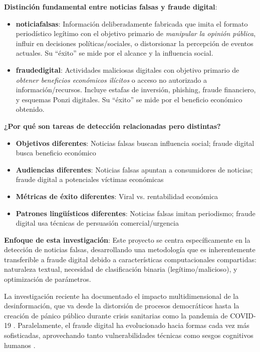 \textbf{Distinción fundamental entre noticias falsas y fraude digital}: 

\begin{itemize}
    \item \textbf{\Glspl{noticiafalsa}}: Información deliberadamente fabricada que imita el formato periodístico legítimo con el objetivo primario de \textit{manipular la opinión pública}, influir en decisiones políticas/sociales, o distorsionar la percepción de eventos actuales. Su ``éxito'' se mide por el alcance y la influencia social.
    
    \item \textbf{\Gls{fraudedigital}}: Actividades maliciosas digitales con objetivo primario de \textit{obtener beneficios económicos ilícitos} o acceso no autorizado a información/recursos. Incluye estafas de inversión, phishing, fraude financiero, y esquemas Ponzi digitales. Su ``éxito'' se mide por el beneficio económico obtenido.
\end{itemize}

\textbf{¿Por qué son tareas de detección relacionadas pero distintas?}
\begin{itemize}
    \item \textbf{Objetivos diferentes}: Noticias falsas buscan influencia social; fraude digital busca beneficio económico
    \item \textbf{Audiencias diferentes}: Noticias falsas apuntan a consumidores de noticias; fraude digital a potenciales víctimas económicas
    \item \textbf{Métricas de éxito diferentes}: Viral vs. rentabilidad económica
    \item \textbf{Patrones lingüísticos diferentes}: Noticias falsas imitan periodismo; fraude digital usa técnicas de persuasión comercial/urgencia
\end{itemize}

\textbf{Enfoque de esta investigación}: Este proyecto se centra específicamente en la detección de noticias falsas, desarrollando una metodología que es inherentemente transferible a fraude digital debido a características computacionales compartidas: naturaleza textual, necesidad de clasificación binaria (legítimo/malicioso), y optimización de parámetros.

La investigación reciente ha documentado el impacto multidimensional de la desinformación, que va desde la distorsión de procesos democráticos \cite{ali2020posttruth} hasta la creación de pánico público durante crisis sanitarias como la pandemia de COVID-19 \cite{perez2020fake}. Paralelamente, el fraude digital ha evolucionado hacia formas cada vez más sofisticadas, aprovechando tanto vulnerabilidades técnicas como sesgos cognitivos humanos \cite{ali2021fake}.

